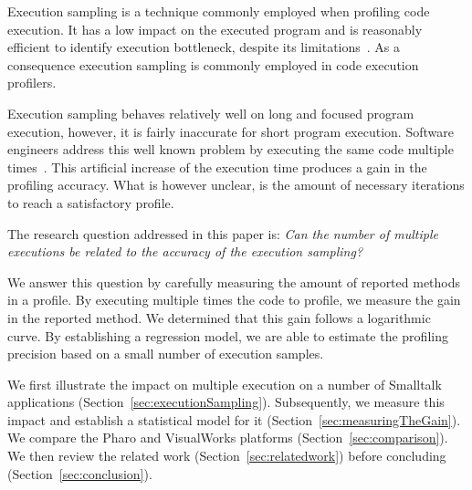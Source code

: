\documentclass{sig-alternate}
\newcommand{\secref}[1]{Section~\ref{sec:#1}}
\begin{document}
Execution sampling is a technique commonly employed when profiling code execution. It has a low impact on the executed program and is reasonably efficient to identify execution bottleneck, despite its limitations~\cite{Berg11d,Jovi11a,Mytk10a}. As a consequence execution sampling is commonly employed in code execution profilers.

Execution sampling behaves relatively well on long and focused program execution, however, it is fairly inaccurate for short program execution. Software engineers address this well known problem by executing the same code multiple times~\cite{Wils00a}. This artificial increase of the execution time produces a gain in the profiling accuracy. What is however unclear, is the amount of necessary iterations to reach a satisfactory profile. 

The research question addressed in this paper is: \emph{Can the number of multiple executions be related to the accuracy of the execution sampling?}

We answer this question by carefully measuring the amount of reported methods in a profile. By executing multiple times the code to profile, we measure the gain in the reported method. We determined that this gain follows a logarithmic curve. By establishing a regression model, we are able to estimate the profiling precision based on a small number of execution samples.




We first illustrate the impact on multiple execution on a number of Smalltalk applications (\secref{executionSampling}). 
Subsequently, we measure this impact and establish a statistical model for it (\secref{measuringTheGain}).
We compare the Pharo and VisualWorks platforms (\secref{comparison}).
We then review the related work (\secref{relatedwork}) before concluding (\secref{conclusion}).
\end{document}

